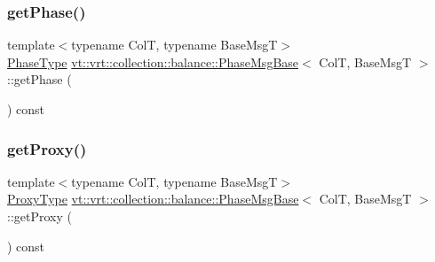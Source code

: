 \mbox{\label{structvt_1_1vrt_1_1collection_1_1balance_1_1_phase_msg_base_ac725a307fa6cd208b76e59759428f88c}} 
\subsubsection{\texorpdfstring{get\+Phase()}{getPhase()}}
{\footnotesize\ttfamily template$<$typename ColT, typename Base\+MsgT$>$ \\
\hyperlink{namespacevt_a46ce6733d5cdbd735d561b7b4029f6d7}{Phase\+Type} \hyperlink{structvt_1_1vrt_1_1collection_1_1balance_1_1_phase_msg_base}{vt\+::vrt\+::collection\+::balance\+::\+Phase\+Msg\+Base}$<$ ColT, Base\+MsgT $>$\+::get\+Phase (\begin{DoxyParamCaption}{ }\end{DoxyParamCaption}) const\hspace{0.3cm}{\ttfamily [inline]}}

\mbox{\label{structvt_1_1vrt_1_1collection_1_1balance_1_1_phase_msg_base_a3c7b317ac32bd23c20526952e3aaf499}} 
\subsubsection{\texorpdfstring{get\+Proxy()}{getProxy()}}
{\footnotesize\ttfamily template$<$typename ColT, typename Base\+MsgT$>$ \\
\hyperlink{structvt_1_1vrt_1_1collection_1_1balance_1_1_phase_msg_base_a21c9d10c5a8d1386f4e0a1bfa04f482f}{Proxy\+Type} \hyperlink{structvt_1_1vrt_1_1collection_1_1balance_1_1_phase_msg_base}{vt\+::vrt\+::collection\+::balance\+::\+Phase\+Msg\+Base}$<$ ColT, Base\+MsgT $>$\+::get\+Proxy (\begin{DoxyParamCaption}{ }\end{DoxyParamCaption}) const\hspace{0.3cm}{\ttfamily [inline]}}

